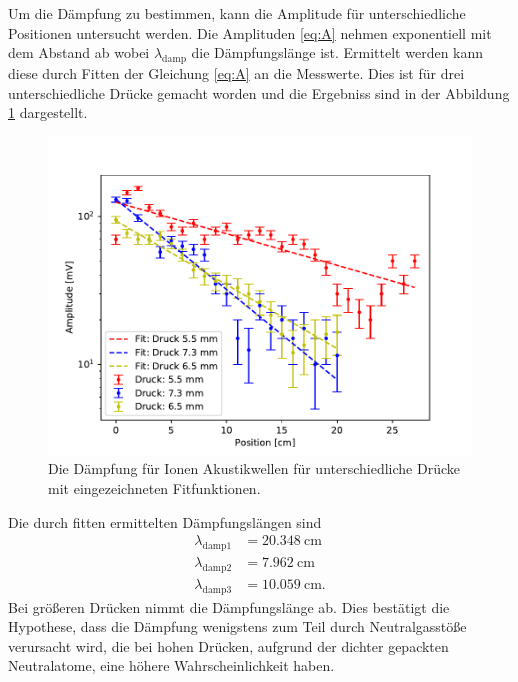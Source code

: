 Um die Dämpfung zu bestimmen, kann die Amplitude für unterschiedliche Positionen untersucht werden. Die Amplituden \eqref{eq:A} nehmen exponentiell mit dem Abstand ab
wobei $\lambda_{\mathrm{damp}}$ die Dämpfungslänge ist. Ermittelt werden kann diese durch Fitten der Gleichung \eqref{eq:A} an die Messwerte. Dies ist für drei unterschiedliche Drücke gemacht worden und die Ergebniss sind in der Abbildung \ref {fig:3_3_Daempfung} dargestellt. 
\begin{figure}[H]
\centering
\includegraphics[scale=0.6]{3_3_Daempfung.pdf}
\caption{Die Dämpfung für Ionen Akustikwellen für unterschiedliche Drücke mit eingezeichneten Fitfunktionen.}
\label{fig:3_3_Daempfung}
\end{figure}
Die durch fitten ermittelten Dämpfungslängen sind
\begin{align}
  \lambda_{\mathrm{damp} 1} &= 20.348\ \mathrm{cm} \\
  \lambda_{\mathrm{damp} 2} &=  7.962\  \mathrm{cm} \\
  \lambda_{\mathrm{damp} 3} &= 10.059\  \mathrm{cm}. 
\end{align}
Bei größeren Drücken nimmt die Dämpfungslänge ab. Dies bestätigt die Hypothese, dass die Dämpfung wenigstens zum Teil durch Neutralgasstöße verursacht wird, die bei hohen Dr\"ucken, aufgrund der dichter gepackten Neutralatome, eine h\"ohere Wahrscheinlichkeit haben.
